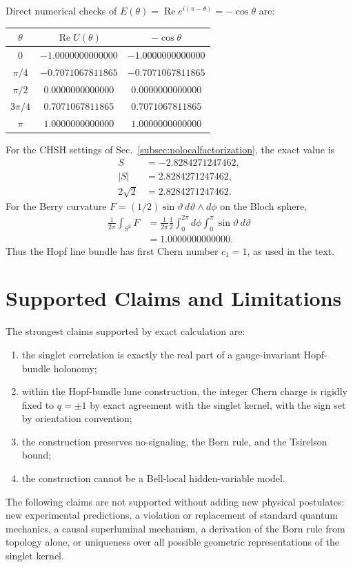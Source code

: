 \documentclass[
  aps,
  pra,
  reprint,
  superscriptaddress,
  nofootinbib,
  longbibliography,
  floatfix,
  amsmath,
  amssymb
]{revtex4-2}
\theoremstyle{plain}
\theoremstyle{definition}
\theoremstyle{remark}
\begin{document}
Direct numerical checks of $E(\theta)=\operatorname{Re}e^{i(\pi-\theta)}=-\cos\theta$ are:
\begin{center}
\begin{tabular}{ccc}
\toprule
$\theta$ & $\operatorname{Re}U(\theta)$ & $-\cos\theta$ \\
\midrule
$0$ & $-1.0000000000000$ & $-1.0000000000000$ \\
$\pi/4$ & $-0.7071067811865$ & $-0.7071067811865$ \\
$\pi/2$ & $0.0000000000000$ & $0.0000000000000$ \\
$3\pi/4$ & $0.7071067811865$ & $0.7071067811865$ \\
$\pi$ & $1.0000000000000$ & $1.0000000000000$ \\
\bottomrule
\end{tabular}
\end{center}

For the CHSH settings of Sec.~\ref{subsec:nolocalfactorization}, the exact value is
\begin{align}
S&=-2.8284271247462,\\
|S|&=2.8284271247462,\\
2\sqrt2&=2.8284271247462.
\end{align}
For the Berry curvature $F=(1/2)\sin\vartheta\,d\vartheta\wedge d\phi$ on the Bloch sphere,
\begin{equation}
\begin{split}
\frac{1}{2\pi}\int_{S^2}F
&=\frac{1}{2\pi}\frac12\int_0^{2\pi}\!d\phi
  \int_0^\pi\!\sin\vartheta\,d\vartheta\\
&=1.0000000000000.
\end{split}
\end{equation}
Thus the Hopf line bundle has first Chern number $c_1=1$, as used in the text.

\section{Supported Claims and Limitations}
\label{app:limitations}

The strongest claims supported by exact calculation are:
\begin{enumerate}
\item the singlet correlation is exactly the real part of a gauge-invariant Hopf-bundle holonomy;
\item within the Hopf-bundle lune construction, the integer Chern charge is rigidly fixed to $q=\pm1$ by exact agreement with the singlet kernel, with the sign set by orientation convention;
\item the construction preserves no-signaling, the Born rule, and the Tsirelson bound;
\item the construction cannot be a Bell-local hidden-variable model.
\end{enumerate}
The following claims are not supported without adding new physical postulates: new experimental predictions, a violation or replacement of standard quantum mechanics, a causal superluminal mechanism, a derivation of the Born rule from topology alone, or uniqueness over all possible geometric representations of the singlet kernel.
\end{document}
